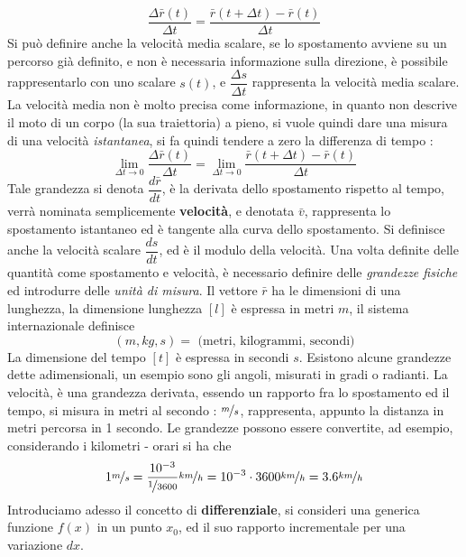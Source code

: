 \documentclass[10pt, letterpaper]{report}
\begin{document}
 $$ 
 \frac{\Delta \bar r (t)}{\Delta t}=\frac{\bar r(t+\Delta t)-\bar r(t)}{\Delta t}
 $$
Si può definire anche la velocità media scalare, se lo spostamento avviene 
su un percorso già definito, e non è necessaria informazione sulla 
direzione, è possibile rappresentarlo con uno scalare 
$s(t)$, e $\dfrac{\Delta s}{\Delta t}$ rappresenta la velocità media 
scalare.\acc 
La velocità media non è molto precisa come informazione, in quanto 
non descrive il moto di un corpo (la sua traiettoria) a pieno, 
si vuole quindi dare una misura di una velocità \textit{istantanea}, 
si fa quindi tendere a zero la differenza di tempo : 
$$
\lim_{\Delta t\rightarrow 0} \frac{\Delta \bar r (t)}{\Delta t}=
\lim_{\Delta t\rightarrow 0} \frac{\bar r(t+\Delta t)-\bar r(t)}{\Delta t}
$$
Tale grandezza si denota $\dfrac{d\bar r}{d t}$, è la derivata 
dello spostamento rispetto al tempo, verrà nominata semplicemente  
\textbf{velocità}, e denotata $\bar v$,  rappresenta lo spostamento istantaneo ed è 
tangente alla curva dello spostamento. Si definisce anche la 
velocità scalare  $\dfrac{d s}{d t}$, ed è il modulo della 
velocità.\acc 
Una volta definite delle quantità come spostamento e velocità, è necessario 
definire delle \textit{grandezze fisiche} ed introdurre delle 
\textit{unità di misura}. Il vettore $\bar r$ ha le dimensioni di una lunghezza, la dimensione 
lunghezza $[l]$ è espressa in metri $m$, il sistema internazionale definisce  
$$ (m,kg,s)=\text{ (metri, kilogrammi, secondi)}$$
La dimensione del tempo $[t]$ è espressa in secondi $s$. Esistono alcune grandezze 
dette adimensionali, un esempio sono gli angoli, misurati in gradi o radianti.
\acc 
La velocità, è una grandezza derivata, essendo un rapporto fra lo spostamento ed il tempo, 
si misura in metri al secondo : $\nicefrac{m}{s}$, rappresenta, appunto la distanza in 
metri percorsa in 1 secondo. Le grandezze possono essere convertite, ad esempio, considerando 
i kilometri - orari si ha che 
$$ 1\nicefrac{m}{s}= 
\frac{10^{-3}}{\nicefrac{1}{3600}}\nicefrac{km}{h}= 
10^{-3}\cdot 3600 \nicefrac{km}{h}=3.6\nicefrac{km}{h}$$
Introduciamo adesso il concetto di \textbf{differenziale}, si consideri una generica funzione 
$f(x)$ in un punto $x_0$, ed il suo rapporto incrementale per una variazione $d x$.
\end{document}
